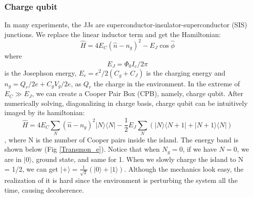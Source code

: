 \subsubsection{Charge qubit}
In many experiments, the JJs are superconductor-insulator-superconductor (SIS) junctions. We replace the linear inductor term and get the Hamiltonian\cite{RN7}:
\begin{equation}\label{HamiltonianCharge}
    \hat{H} = 4E_C (\hat{n} - n_g)^2 - E_J \cos \hat{\phi}
\end{equation}
where 
\begin{equation}\label{JJenergy}
    E_J = \Phi_0 I_c / 2\pi 
\end{equation}
is the Josephson energy, $E_c = e^2 / 2(C_g + C_J)$ is the charging energy and $n_g = Q_r / 2e + C_g V_g /2e$, as $Q_r$ the charge in the environment. 
In the extreme of $E_C \gg E_J$, we can create a Cooper Pair Box (CPB), namely, charge qubit. After numerically solving, diagonalizing in charge basis, charge qubit can be intuitively imaged by its hamiltonian:
\begin{equation}\label{CPB_H}
    \hat{H} = 4E_C\sum_N (\hat{n} - n_g)^2|N\rangle \langle N| - \frac{1}{2} E_J \sum_N (|N\rangle\langle N+1| + |N+1\rangle \langle N |)
\end{equation}
, where N is the number of Cooper pairs inside the island. The energy band is shown below (Fig \ref{Transmon_e}). Notice that when $N_g = 0$, if we have $N=0$, we are in $|0\rangle$, ground state, and same for 1. When we slowly charge the island to N = 1/2, we can get $|+\rangle = \frac{1}{\sqrt{2}}(|0\rangle + |1\rangle)$. Although the mechanics look easy, the realization of it is hard since the environment is perturbing the system all the time, causing decoherence.
